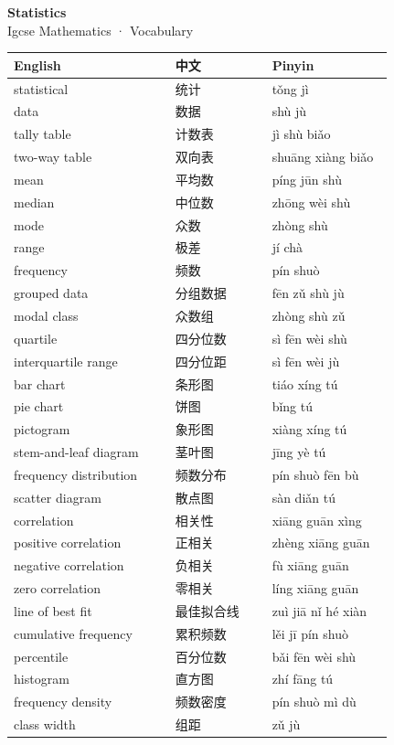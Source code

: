 \documentclass[11pt]{article}
\begin{document}
\begin{center}
  {\LARGE\bfseries Statistics}\\[0.35em]
  {\large Igcse Mathematics · Vocabulary}
\end{center}
\vspace{0.6em}

\begin{longtable}{@{}p{0.40\linewidth}p{0.24\linewidth}p{0.30\linewidth}@{}}
\toprule
\textbf{English} & \textbf{中文} & \textbf{Pinyin} \\
\midrule
\endhead
\bottomrule
\endlastfoot
statistical & 统计 & tǒng jì \\
data & 数据 & shù jù \\
tally table & 计数表 & jì shù biǎo \\
two-way table & 双向表 & shuāng xiàng biǎo \\
mean & 平均数 & píng jūn shù \\
median & 中位数 & zhōng wèi shù \\
mode & 众数 & zhòng shù \\
range & 极差 & jí chà \\
frequency & 频数 & pín shuò \\
grouped data & 分组数据 & fēn zǔ shù jù \\
modal class & 众数组 & zhòng shù zǔ \\
quartile & 四分位数 & sì fēn wèi shù \\
interquartile range & 四分位距 & sì fēn wèi jù \\
bar chart & 条形图 & tiáo xíng tú \\
pie chart & 饼图 & bǐng tú \\
pictogram & 象形图 & xiàng xíng tú \\
stem-and-leaf diagram & 茎叶图 & jīng yè tú \\
frequency distribution & 频数分布 & pín shuò fēn bù \\
scatter diagram & 散点图 & sàn diǎn tú \\
correlation & 相关性 & xiāng guān xìng \\
positive correlation & 正相关 & zhèng xiāng guān \\
negative correlation & 负相关 & fù xiāng guān \\
zero correlation & 零相关 & líng xiāng guān \\
line of best fit & 最佳拟合线 & zuì jiā nǐ hé xiàn \\
cumulative frequency & 累积频数 & lěi jī pín shuò \\
percentile & 百分位数 & bǎi fēn wèi shù \\
histogram & 直方图 & zhí fāng tú \\
frequency density & 频数密度 & pín shuò mì dù \\
class width & 组距 & zǔ jù \\
\end{longtable}
\end{document}
